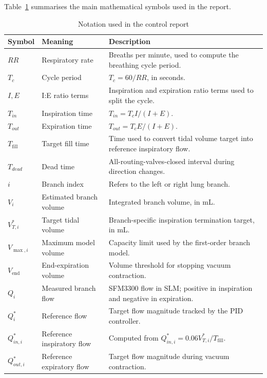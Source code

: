 \documentclass[11pt,a4paper]{article}
\renewcommand{\arraystretch}{1.22}
\begin{document}
Table~\ref{tab:notation} summarises the main mathematical symbols used in the report.

\begin{table}[H]
\centering
\caption{Notation used in the control report}
\label{tab:notation}
\scriptsize
\setlength{\tabcolsep}{4pt}
\renewcommand{\arraystretch}{1.12}
\begin{tabularx}{0.96\textwidth}{
  >{\centering\arraybackslash}p{2.0cm}
  >{\raggedright\arraybackslash}p{3.2cm}
  X
}
\toprule
\textbf{Symbol} & \textbf{Meaning} & \textbf{Description} \\
\midrule
$RR$ & Respiratory rate & Breaths per minute, used to compute the breathing cycle period. \\
$T_c$ & Cycle period & $T_c=60/RR$, in seconds. \\
$I,E$ & I:E ratio terms & Inspiration and expiration ratio terms used to split the cycle. \\
$T_{in}$ & Inspiration time & $T_{in}=T_c I/(I+E)$. \\
$T_{out}$ & Expiration time & $T_{out}=T_c E/(I+E)$. \\
$T_{\mathrm{fill}}$ & Target fill time & Time used to convert tidal volume target into reference inspiratory flow. \\
$T_{dead}$ & Dead time & All-routing-valves-closed interval during direction changes. \\
$i$ & Branch index & Refers to the left or right lung branch. \\
$V_i$ & Estimated branch volume & Integrated branch volume, in mL. \\
$V^*_{T,i}$ & Target tidal volume & Branch-specific inspiration termination target, in mL. \\
$V_{\max,i}$ & Maximum model volume & Capacity limit used by the first-order branch model. \\
$V_{\mathrm{end}}$ & End-expiration volume & Volume threshold for stopping vacuum contraction. \\
$Q_i$ & Measured branch flow & SFM3300 flow in SLM; positive in inspiration and negative in expiration. \\
$Q^*_i$ & Reference flow & Target flow magnitude tracked by the PID controller. \\
$Q^*_{in,i}$ & Reference inspiratory flow & Computed from $Q^*_{in,i}=0.06V^*_{T,i}/T_{\mathrm{fill}}$. \\
$Q^*_{out,i}$ & Reference expiratory flow & Target flow magnitude during vacuum contraction. \\

\end{tabularx}
\end{table}
\end{document}
